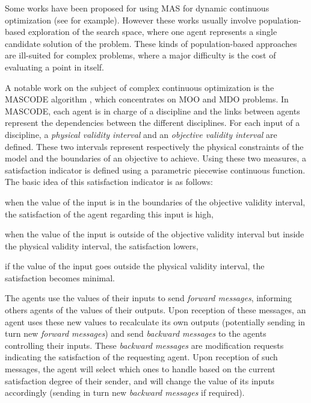 Some works have been proposed for using MAS for dynamic continuous optimization (see \cite{lepagnot2010new} for example). However these works usually involve population-based exploration of the search space, where one agent represents a single candidate solution of the problem. These kinds of population-based approaches are ill-suited for complex problems, where a major difficulty is the cost of evaluating a point in itself.

A notable work on the subject of complex continuous optimization is the MASCODE algorithm \cite{welcomme2006self}, which concentrates on MOO and MDO problems. In MASCODE, each agent is in charge of a discipline and the links between agents represent the dependencies between the different disciplines. For each input of a discipline, a \emph{physical validity interval} and an \emph{objective validity interval} are defined. These two intervals represent respectively the physical constraints of the model and the boundaries of an objective to achieve. Using these two measures, a satisfaction indicator is defined using a parametric piecewise continuous function. The basic idea of this satisfaction indicator is as follows: 
\begin{compactitem}
\item when the value of the input is in the boundaries of the objective validity interval, the satisfaction of the agent regarding this input is high,
\item when the value of the input is outside of the objective validity interval but inside the physical validity interval, the satisfaction lowers,
\item if the value of the input goes outside the physical validity interval, the satisfaction becomes minimal.
\end{compactitem}

The agents use the values of their inputs to send \emph{forward messages}, informing others agents of the values of their outputs. Upon reception of these messages, an agent uses these new values to recalculate its own outputs (potentially sending in turn new \emph{forward messages}) and send \emph{backward messages} to the agents controlling their inputs. These \emph{backward messages} are modification requests indicating the satisfaction of the requesting agent. Upon reception of such messages, the agent will select which ones to handle based on the current satisfaction degree of their sender, and will change the value of its inputs accordingly (sending in turn new \emph{backward messages} if required).

